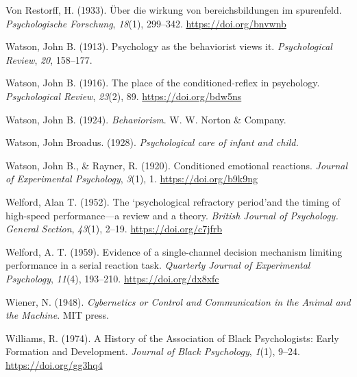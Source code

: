 \documentclass[
  oneside,
  12pt]{crumpbook}
\newlength{\cslhangindent}
\newlength{\cslentryspacingunit} %
\newenvironment{CSLReferences}[2] %
 {%
  \setlength{\parindent}{0pt}
  \ifodd #1
  \let\oldpar\par
  \def\par{\hangindent=\cslhangindent\oldpar}
  \fi
  \setlength{\parskip}{#2\cslentryspacingunit}
 }%
 {}
\begin{document}
\begin{CSLReferences}{1}{0}
\leavevmode{}%
Von Restorff, H. (1933). Über die wirkung von bereichsbildungen im spurenfeld. \emph{Psychologische Forschung}, \emph{18}(1), 299--342. \url{https://doi.org/bnvwnb}

\leavevmode{}%
Watson, John B. (1913). Psychology as the behaviorist views it. \emph{Psychological Review}, \emph{20}, 158--177.

\leavevmode{}%
Watson, John B. (1916). The place of the conditioned-reflex in psychology. \emph{Psychological Review}, \emph{23}(2), 89. \url{https://doi.org/bdw5ns}

\leavevmode{}%
Watson, John B. (1924). \emph{Behaviorism}. {W. W. Norton \& Company}.

\leavevmode{}%
Watson, John Broadus. (1928). \emph{Psychological care of infant and child.}

\leavevmode{}%
Watson, John B., \& Rayner, R. (1920). Conditioned emotional reactions. \emph{Journal of Experimental Psychology}, \emph{3}(1), 1. \url{https://doi.org/b9k9ng}

\leavevmode{}%
Welford, Alan T. (1952). The `psychological refractory period'and the timing of high-speed performance---a review and a theory. \emph{British Journal of Psychology. General Section}, \emph{43}(1), 2--19. \url{https://doi.org/c7jfrb}

\leavevmode{}%
Welford, A. T. (1959). Evidence of a single-channel decision mechanism limiting performance in a serial reaction task. \emph{Quarterly Journal of Experimental Psychology}, \emph{11}(4), 193--210. \url{https://doi.org/dx8xfc}

\leavevmode{}%
Wiener, N. (1948). \emph{Cybernetics or {Control} and {Communication} in the {Animal} and the {Machine}}. {MIT press}.

\leavevmode{}%
Williams, R. (1974). A {History} of the {Association} of {Black Psychologists}: {Early Formation} and {Development}. \emph{Journal of Black Psychology}, \emph{1}(1), 9--24. \url{https://doi.org/gg3hq4}


\end{CSLReferences}
\end{document}
